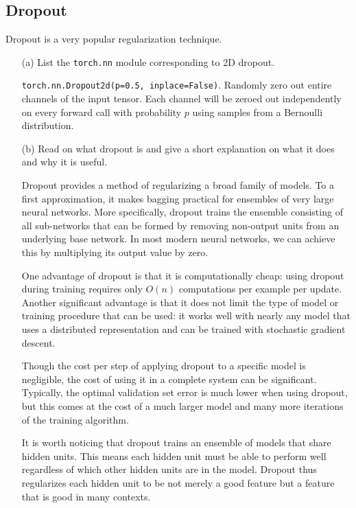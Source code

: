 \documentclass{article}
\begin{document}
\subsection{Dropout}
Dropout is a very popular regularization technique.
\begin{itemize}
    \item[(a)] List the \texttt{torch.nn} module corresponding to 2D dropout.
    
    \texttt{torch.nn.Dropout2d(p=0.5, inplace=False)}. Randomly zero out entire channels of the input tensor. Each channel will be zeroed out independently on every forward call with probability $p$ using samples from a Bernoulli distribution.
    
    \item[(b)] Read on what dropout is and give a short explanation on what it does and why it is useful.
    
    Dropout provides a method of regularizing a broad family of models. To a first approximation, it makes bagging practical for ensembles of very large neural networks. More specifically, dropout trains the ensemble consisting of all sub-networks that can be formed by removing non-output units from an underlying base network. In most modern neural networks, we can achieve this by multiplying its output value by zero.
    
    One advantage of dropout is that it is computationally cheap: using dropout during training requires only $O(n)$ computations per example per update. Another significant advantage is that it does not limit the type of model or training procedure that can be used: it works well with nearly any model that uses a distributed representation and can be trained with stochastic gradient descent.
    
    Though the cost per step of applying dropout to a specific model is negligible, the cost of using it in a complete system can be significant. Typically, the optimal validation set error is much lower when using dropout, but this comes at the cost of a much larger model and many more iterations of the training algorithm. 

    It is worth noticing that dropout trains an ensemble of models that share hidden units. This means each hidden unit must be able to perform well regardless of which other hidden units are in the model. Dropout thus regularizes each hidden unit to be not merely a good feature but a feature that is good in many contexts.
\end{itemize}
\end{document}
